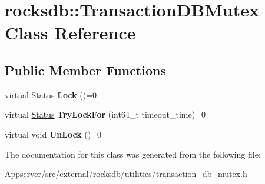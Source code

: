 \hypertarget{classrocksdb_1_1TransactionDBMutex}{}\section{rocksdb\+:\+:Transaction\+D\+B\+Mutex Class Reference}
\label{classrocksdb_1_1TransactionDBMutex}
\subsection*{Public Member Functions}
\begin{DoxyCompactItemize}
\item 
virtual \hyperlink{classrocksdb_1_1Status}{Status} {\bfseries Lock} ()=0\hypertarget{classrocksdb_1_1TransactionDBMutex_ab90baea2ea8b5b6d3e5c98fbf8af5ab9}{}\label{classrocksdb_1_1TransactionDBMutex_ab90baea2ea8b5b6d3e5c98fbf8af5ab9}

\item 
virtual \hyperlink{classrocksdb_1_1Status}{Status} {\bfseries Try\+Lock\+For} (int64\+\_\+t timeout\+\_\+time)=0\hypertarget{classrocksdb_1_1TransactionDBMutex_af089e6f7692b53973a37b530a23f1c87}{}\label{classrocksdb_1_1TransactionDBMutex_af089e6f7692b53973a37b530a23f1c87}

\item 
virtual void {\bfseries Un\+Lock} ()=0\hypertarget{classrocksdb_1_1TransactionDBMutex_a0c0568bb4656fa0733095ee13d35c527}{}\label{classrocksdb_1_1TransactionDBMutex_a0c0568bb4656fa0733095ee13d35c527}

\end{DoxyCompactItemize}


The documentation for this class was generated from the following file\+:\begin{DoxyCompactItemize}
\item 
Appserver/src/external/rocksdb/utilities/transaction\+\_\+db\+\_\+mutex.\+h\end{DoxyCompactItemize}
